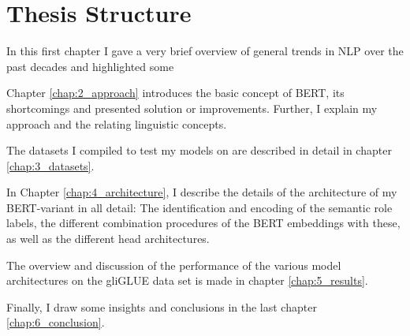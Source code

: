 \section{Thesis Structure}

In this first chapter I gave a very brief overview of general trends in
NLP over the past decades and highlighted some

Chapter \ref{chap:2_approach} introduces the basic concept of BERT,
its {\color{red} shortcomings} and presented solution or improvements. Further,
I explain my approach and the relating linguistic concepts.

The datasets I compiled to test my models on are described in detail
in chapter \ref{chap:3_datasets}.

In Chapter \ref{chap:4_architecture}, I describe the details of the architecture of
my BERT-variant in all detail: The identification and encoding of the semantic role
labels, the different combination procedures of the BERT embeddings with these, as
well as the different head architectures.

The overview and discussion of the performance of the various model architectures on
the gliGLUE data set is made in chapter \ref{chap:5_results}.

Finally, I draw some insights and conclusions in the last chapter \ref{chap:6_conclusion}.

